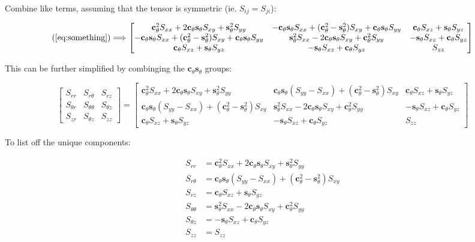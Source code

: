 \documentclass{article}
\def\ct{\mathbf{c}_{\theta}}
\def\st{\mathbf{s}_{\theta}}
\def\sxx{S_{xx}}
\def\sxy{S_{xy}}
\def\sxz{S_{xz}}
\def\syy{S_{yy}}
\def\syz{S_{yz}}
\def\szz{S_{zz}}
\begin{document}
Combine like terms, assuming that the tensor is symmetric (ie. \(S_{ij} = S_{ji}\)):

\begin{equation}
    (\ref{eq:something}) \Longrightarrow 
    \begin{bmatrix}
        \ct^2\sxx + 2\ct\st\sxy + \st^2\syy & 
        -\ct\st\sxx + (\ct^2- \st^2)\sxy + \ct\st\syy & 
        \ct\sxz + \st\syz \\
        -\ct\st\sxx + (\ct^2 - \st^2)\sxy + \ct\st\syy & \st^2\sxx - 2\ct\st\sxy + \ct^2\syy & -\st\sxz + \ct\syz \\
        \ct\sxz + \st\syz & -\st\sxz + \ct\syz & \szz
    \end{bmatrix}
\end{equation}

This can be further simplified by combinging the \(\ct\st\) groups:

\begin{equation}
    \begin{bmatrix}
    S_{rr} & S_{r\theta} & S_{rz} \\
    S_{\theta r} & S_{\theta\theta} & S_{\theta z} \\
    S_{zr} & S_{\theta z} & S_{zz}
    \end{bmatrix}
    =
    \begin{bmatrix}
        \ct^2\sxx + 2\ct\st\sxy + \st^2\syy & 
        \ct\st(\syy-\sxx) + (\ct^2- \st^2)\sxy & 
        \ct\sxz + \st\syz \\
        \ct\st(\syy-\sxx) + (\ct^2- \st^2)\sxy & \st^2\sxx - 2\ct\st\sxy + \ct^2\syy & -\st\sxz + \ct\syz \\
        \ct\sxz + \st\syz & -\st\sxz + \ct\syz & \szz
    \end{bmatrix}
\end{equation}

To list off the unique components:

\begin{align}
        S_{rr} &= \ct^2\sxx + 2\ct\st\sxy + \st^2\syy \\
        S_{r\theta} &= \ct\st(\syy-\sxx) + (\ct^2- \st^2)\sxy \\
        S_{rz} &= \ct\sxz + \st\syz \\
        S_{\theta\theta} &= \st^2\sxx - 2\ct\st\sxy + \ct^2\syy \\
        S_{\theta z} &= -\st\sxz + \ct\syz \\
        S_{zz} &= S_{zz}
\end{align}
\end{document}

